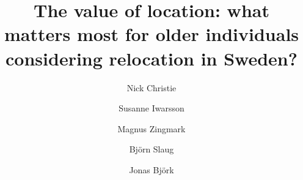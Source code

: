 \documentclass[3p,11pt ]{elsarticle}
\begin{document}
\begin{frontmatter}



\title{The value of location: what matters most for older individuals considering relocation in Sweden?}


\author[1]{Nick Christie}

\author[1]{Susanne Iwarsson}

\author[1]{Magnus Zingmark}


\author[1]{Bj\"orn Slaug}

\author[2]{Jonas Bj\"ork}



















\end{frontmatter}
\end{document}
